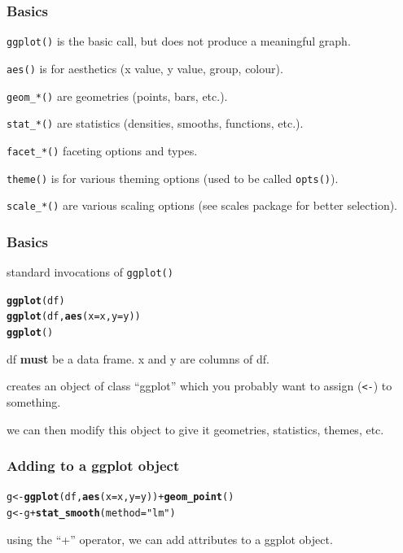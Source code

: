 \documentclass{beamer}\usepackage{graphicx, color}
\makeatletter
\newcommand{\hlfunctioncall}[1]{\textcolor[rgb]{0.501960784313725,0,0.329411764705882}{\textbf{#1}}}%
\newcommand{\hlstring}[1]{\textcolor[rgb]{0.6,0.6,1}{#1}}%
\newenvironment{kframe}{%
 \def\at@end@of@kframe{}%
 \ifinner\ifhmode%
  \def\at@end@of@kframe{\end{minipage}}%
  \begin{minipage}{\columnwidth}%
 \fi\fi%
 \def\FrameCommand##1{\hskip\@totalleftmargin \hskip-\fboxsep
 \colorbox{shadecolor}{##1}\hskip-\fboxsep
     \hskip-\linewidth \hskip-\@totalleftmargin \hskip\columnwidth}%
 \MakeFramed {\advance\hsize-\width
   \@totalleftmargin\z@ \linewidth\hsize
   \@setminipage}}%
 {\par\unskip\endMakeFramed%
 \at@end@of@kframe}
\newenvironment{knitrout}{}{} %
\makeatother
\begin{document}
\begin{frame}
  \frametitle{Basics}
  \texttt{ggplot()} is the basic call, but does not produce a meaningful graph.

  \texttt{aes()} is for aesthetics (x value, y value, group, colour).

  \texttt{geom\_*()} are geometries (points, bars, etc.).

  \texttt{stat\_*()} are statistics (densities, smooths, functions, etc.).

  \texttt{facet\_*()} faceting options and types.

  \texttt{theme()} is for various theming options (used to be called \texttt{opts()}).

  \texttt{scale\_*()} are various scaling options (see scales package for better selection).

\end{frame}

\begin{frame}[fragile]
  \frametitle{Basics}
  standard invocations of \texttt{ggplot()}

\begin{knitrout}
\color{fgcolor}\begin{kframe}
\begin{alltt}
\hlfunctioncall{ggplot}(df)
\hlfunctioncall{ggplot}(df, \hlfunctioncall{aes}(x = x, y = y))
\hlfunctioncall{ggplot}()
\end{alltt}
\end{kframe}
\end{knitrout}


  df \textbf{must} be a data frame. x and y are columns of df.
  
  creates an object of class ``ggplot'' which you probably want to assign (\texttt{<-}) to something.

  we can then modify this object to give it geometries, statistics, themes, etc.

\end{frame}

\begin{frame}[fragile]
  \frametitle{Adding to a ggplot object}
\begin{knitrout}
\color{fgcolor}\begin{kframe}
\begin{alltt}
g <- \hlfunctioncall{ggplot}(df, \hlfunctioncall{aes}(x = x, y = y)) + \hlfunctioncall{geom_point}()
g <- g + \hlfunctioncall{stat_smooth}(method = \hlstring{"lm"})
\end{alltt}
\end{kframe}
\end{knitrout}


  using the ``+'' operator, we can add attributes to a ggplot object.

\end{frame}
\end{document}
